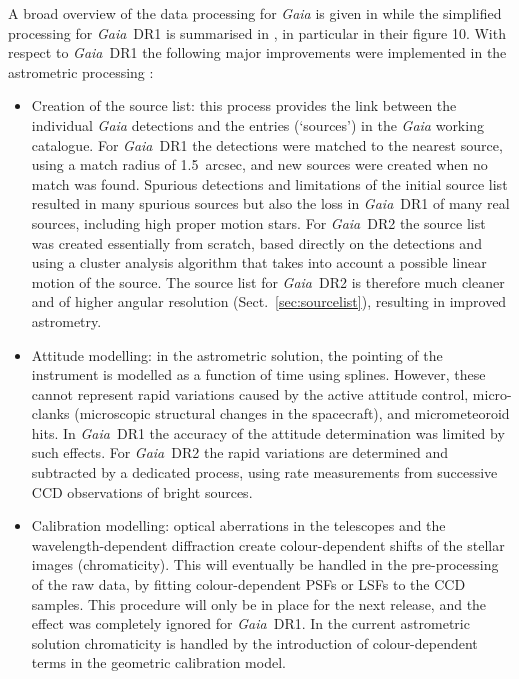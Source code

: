 \documentclass[longauth]{aa_gaia} %
\newcommand\gaia{\textit{Gaia}}
\newcommand\gdr[1]{\gaia~DR#1}
\begin{document}
A broad overview of the data processing for {\gaia} is given in \cite{2016A&A...595A...1G} while the
simplified processing for \gdr{1} is summarised in \cite{2016A&A...595A...2G}, in particular in
their figure 10. With respect to \gdr{1} the following major improvements were implemented in the
astrometric processing \citep[for details, see][]{DR2-DPACP-51}:
\begin{itemize}
  \item Creation of the source list: this process \citep[also known as
    cross-matching;][]{2016A&A...595A...3F} provides the link between the individual {\gaia}
    detections and the entries (`sources') in the {\gaia} working catalogue. For \gdr{1} the
    detections were matched to the nearest source, using a match radius of 1.5~arcsec, and new
    sources were created when no match was found. Spurious detections and limitations of the initial
    source list resulted in many spurious sources but also the loss in \gdr{1} of many real sources,
    including high proper motion stars. For \gdr{2} the source list was created essentially from
    scratch, based directly on the detections and using a cluster analysis algorithm that takes into
    account a possible linear motion of the source. The source list for \gdr{2} is therefore much
    cleaner and of higher angular resolution (Sect.~\ref{sec:sourcelist}), resulting in improved
    astrometry.
  \item Attitude modelling: in the astrometric solution, the pointing of the instrument is modelled
    as a function of time using splines. However, these cannot represent rapid variations caused by
    the active attitude control, micro-clanks (microscopic structural changes in the spacecraft),
    and micrometeoroid hits.  In \gdr{1} the accuracy of the attitude determination was limited by
    such effects. For \gdr{2} the rapid variations are determined and subtracted by a dedicated
    process, using rate measurements from successive CCD observations of bright sources.
  \item Calibration modelling: optical aberrations in the telescopes and the wavelength-dependent
    diffraction create colour-dependent shifts of the stellar images (chromaticity). This will
    eventually be handled in the pre-processing of the raw data, by fitting colour-dependent PSFs or
    LSFs to the CCD samples.  This procedure will only be in place for the next release, and the
    effect was completely ignored for \gdr{1}. In the current astrometric solution chromaticity is
    handled by the introduction of colour-dependent terms in the geometric calibration model.

\end{itemize}
\end{document}
